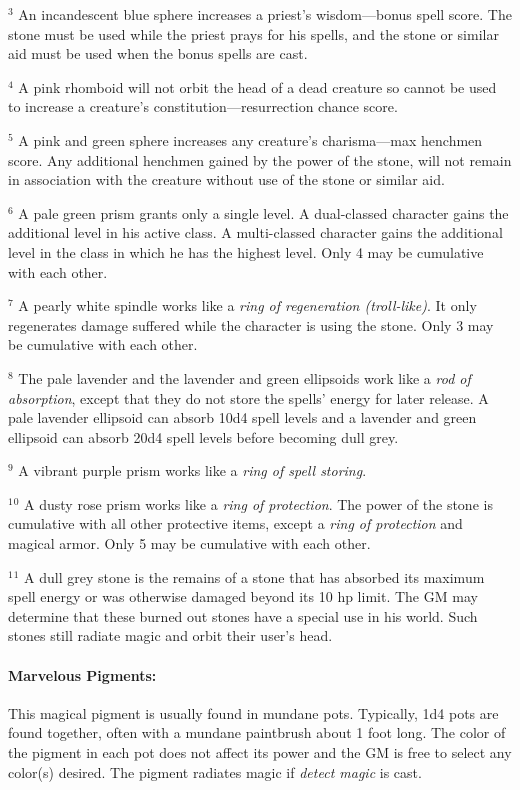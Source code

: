 \begin{multicols}{2}
$^3$ An incandescent blue sphere increases a priest's wisdom---bonus spell score.  The stone must be used while the priest prays for his spells, and the stone or similar aid must be used when the bonus spells are cast.

$^4$ A pink rhomboid will not orbit the head of a dead creature so cannot be used to increase a creature's constitution---resurrection chance score.  

$^5$ A pink and green sphere increases any creature's charisma---max henchmen score.  Any additional henchmen gained by the power of the stone, will not remain in association with the creature without use of the stone or similar aid.

$^6$ A pale green prism grants only a single level.  A dual-classed character gains the additional level in his active class.  A multi-classed character gains the additional level in the class in which he has the highest level.  Only 4 may be cumulative with each other.

$^7$ A pearly white spindle works like a \textit{ring of regeneration (troll-like)}.  It only regenerates damage suffered while the character is using the stone.  Only 3 may be cumulative with each other. 

$^8$ The pale lavender and the lavender and green ellipsoids work like a \textit{rod of absorption}, except that they do not store the spells' energy for later release.  A pale lavender ellipsoid can absorb 10d4 spell levels and a lavender and green ellipsoid can absorb 20d4 spell levels before becoming dull grey.

$^9$ A vibrant purple prism works like a \textit{ring of spell storing}.

$^1$$^0$ A dusty rose prism works like a \textit{ring of protection}.  The power of the stone is cumulative with all other protective items, except a \textit{ring of protection} and magical armor.  Only 5 may be cumulative with each other.

$^1$$^1$ A dull grey stone is the remains of a stone that has absorbed its maximum spell energy or was otherwise damaged beyond its 10 hp limit.  The GM may determine that these burned out stones have a special use in his world.  Such stones still radiate magic and orbit their user's head.

\paragraph{Marvelous Pigments:} This magical pigment is usually found in mundane pots.    Typically, 1d4 pots are found together, often with a mundane paintbrush about 1 foot long.  The color of the pigment in each pot does not affect its power and the GM is free to select any color(s) desired.  The pigment radiates magic if \textit{detect magic} is cast.


\end{multicols}

